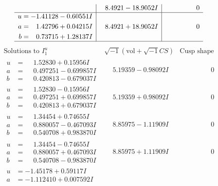 \documentclass[1p]{elsarticle_modified}
\theoremstyle{definition}
\newcommand{\I}{\sqrt{-1}}
\begin{document}
$$\begin{array}{c|c|c}
 & \phantom{-}8.4921 - 18.9052 I & \phantom{-0.000000 } 0 \\ \hline\begin{aligned}
u &= -1.41128 - 0.60551 I \\
a &= \phantom{-}1.42796 + 0.04215 I \\
b &= \phantom{-}0.73715 + 1.28137 I\end{aligned}
 & \phantom{-}8.4921 + 18.9052 I & \phantom{-0.000000 } 0\\
 \hline 
 \end{array}$$\newpage$$\begin{array}{c|c|c}  
\text{Solutions to }I^u_{1}& \I (\text{vol} + \sqrt{-1}CS) & \text{Cusp shape}\\
 \hline 
\begin{aligned}
u &= \phantom{-}1.52830 + 0.15956 I \\
a &= \phantom{-}0.497251 - 0.699857 I \\
b &= \phantom{-}0.420813 - 0.679037 I\end{aligned}
 & \phantom{-}5.19359 - 0.98092 I & \phantom{-0.000000 } 0 \\ \hline\begin{aligned}
u &= \phantom{-}1.52830 - 0.15956 I \\
a &= \phantom{-}0.497251 + 0.699857 I \\
b &= \phantom{-}0.420813 + 0.679037 I\end{aligned}
 & \phantom{-}5.19359 + 0.98092 I & \phantom{-0.000000 } 0 \\ \hline\begin{aligned}
u &= \phantom{-}1.34454 + 0.74655 I \\
a &= \phantom{-}0.880057 - 0.467093 I \\
b &= \phantom{-}0.540708 + 0.983870 I\end{aligned}
 & \phantom{-}8.85975 - 1.11909 I & \phantom{-0.000000 } 0 \\ \hline\begin{aligned}
u &= \phantom{-}1.34454 - 0.74655 I \\
a &= \phantom{-}0.880057 + 0.467093 I \\
b &= \phantom{-}0.540708 - 0.983870 I\end{aligned}
 & \phantom{-}8.85975 + 1.11909 I & \phantom{-0.000000 } 0 \\ \hline\begin{aligned}
u &= -1.45178 + 0.59117 I \\
a &= -1.112410 + 0.007592 I \\

\end{aligned}
\end{array}$$
\end{document}
